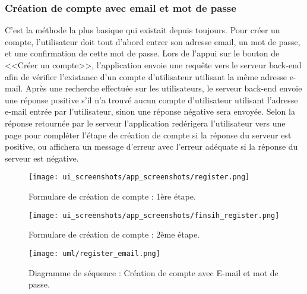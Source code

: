 \subsubsection{Création de compte avec email et mot de passe}
C'est la méthode la plus basique qui existait depuis toujours. Pour créer un compte, l'utilisateur doit tout d'abord entrer son adresse email, un mot de passe, et une confirmation de cette mot de passe. Lors de l'appui sur le bouton de <<Créer un compte>>, l'application envoie une requête vers le serveur back-end afin de vérifier l'existance d'un compte d'utilisateur utilisant la même adresse e-mail. Après une recherche effectuée sur les utilisateurs, le serveur back-end envoie une réponse positive s'il n'a trouvé aucun compte d'utilisateur utilisant l'adresse e-mail entrée par l'utilisateur, sinon une réponse négative sera envoyée. Selon la réponse retournée par le serveur l'application redérigera l'utilisateur vers une page pour compléter l'étape de création de compte si la réponse du serveur est positive, ou affichera un message d'erreur avec l'erreur adéquate si la réponse du serveur est négative.
\begin{multicols}{2}
    \begin{figure}[H]
        \begin{center}
            \centering
            \texttt{[image: ui\_screenshots/app\_screenshots/register.png]}
            \captionsetup{justification=centering}
            \caption{Formulare de création de compte : 1ère étape.}
            \label{fig:app_register}
        \end{center}
    \end{figure}
    \begin{figure}[H]
        \begin{center}
            \centering
            \texttt{[image: ui\_screenshots/app\_screenshots/finsih\_register.png]}
            \captionsetup{justification=centering}
            \caption{Formulare de création de compte : 2ème étape.}
            \label{fig:app_finish_register}
        \end{center}
    \end{figure}
\end{multicols}
\begin{figure}[H]
    \centering
    \texttt{[image: uml/register\_email.png]}
    \vspace{1cm}
    \caption{Diagramme de séquence : Création de compte avec E-mail et mot de passe.}
    \label{fig:seq_register_email}
\end{figure}
